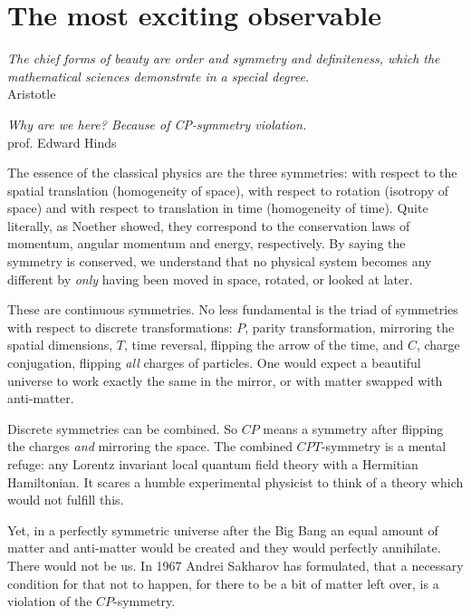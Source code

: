 \chapter{The most exciting observable}
\label{ch:nedm-at-psi}

\begin{center}
  \emph{The chief forms of beauty are order and symmetry and definiteness, which the mathematical sciences demonstrate in a special degree.}\\
  Aristotle
\end{center}


\begin{center}
  \emph{Why are we here? Because of CP-symmetry violation.}\\
  prof. Edward Hinds
\end{center}


The essence of the classical physics are the three symmetries: with respect to the spatial translation (homogeneity of space), with respect to rotation (isotropy of space) and with respect to translation in time (homogeneity of time). Quite literally, as Noether showed, they correspond to the conservation laws of momentum, angular momentum and energy, respectively. By saying the symmetry is conserved, we understand that no physical system becomes any different by \emph{only} having been moved in space, rotated, or looked at later.

These are continuous symmetries. No less fundamental is the triad of symmetries with respect to discrete transformations: $P$, parity transformation, mirroring the spatial dimensions, $T$, time reversal, flipping the arrow of the time, and $C$, charge conjugation, flipping \emph{all} charges of particles. One would expect a beautiful universe to work exactly the same in the mirror, or with matter swapped with anti-matter.

Discrete symmetries can be combined. So $CP$ means a symmetry after flipping the charges \emph{and} mirroring the space. The combined $CPT$-symmetry is a mental refuge: any Lorentz invariant local quantum field theory with a Hermitian Hamiltonian. It scares a humble experimental physicist to think of a theory which would not fulfill this.

Yet, in a perfectly symmetric universe after the Big Bang an equal amount of matter and anti-matter would be created and they would perfectly annihilate. There would not be us.
In 1967 Andrei Sakharov
has formulated, that a necessary condition for that not to happen, for there to be a bit of matter left over, is a violation of the $CP$-symmetry.


